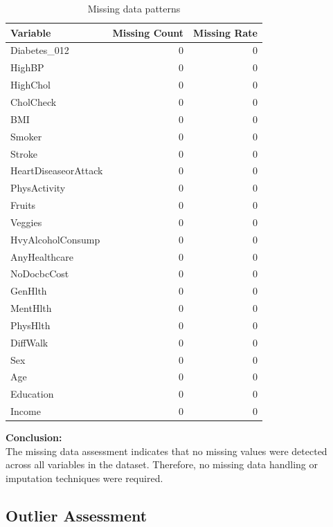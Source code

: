\begin{table}[H]
\centering
\caption{Missing data patterns}
\label{tab:missing_data}

\footnotesize
\setlength{\tabcolsep}{5pt}
\renewcommand{\arraystretch}{1.1}

\begin{tabular}{|l|r|r|}
\hline
\textbf{Variable} & \textbf{Missing Count} & \textbf{Missing Rate} \\
\hline
Diabetes\_012          & 0 & 0 \\
HighBP                 & 0 & 0 \\
HighChol               & 0 & 0 \\
CholCheck              & 0 & 0 \\
BMI                    & 0 & 0 \\
Smoker                 & 0 & 0 \\
Stroke                 & 0 & 0 \\
HeartDiseaseorAttack   & 0 & 0 \\
PhysActivity            & 0 & 0 \\
Fruits                  & 0 & 0 \\
Veggies                 & 0 & 0 \\
HvyAlcoholConsump        & 0 & 0 \\
AnyHealthcare            & 0 & 0 \\
NoDocbcCost              & 0 & 0 \\
GenHlth                  & 0 & 0 \\
MentHlth                 & 0 & 0 \\
PhysHlth                 & 0 & 0 \\
DiffWalk                 & 0 & 0 \\
Sex                      & 0 & 0 \\
Age                      & 0 & 0 \\
Education                & 0 & 0 \\
Income                   & 0 & 0 \\
\hline
\end{tabular}
\end{table}

\textbf{Conclusion:} \\
The missing data assessment indicates that no missing values were detected across all variables in the dataset. Therefore, no missing data handling or imputation techniques were required.

\subsection{Outlier Assessment}

